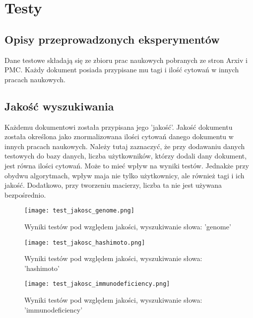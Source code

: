 

\section{Testy}
\subsection{Opisy przeprowadzonych eksperymentów}

Dane testowe składają się ze zbioru prac naukowych pobranych ze stron Arxiv i PMC. Każdy dokument posiada przypisane mu tagi i ilość cytowań w innych pracach naukowych. 



\subsection{Jakość wyszukiwania}

Każdemu dokumentowi została przypisana jego 'jakość'. Jakość dokumentu została określona jako znormalizowana ilości cytowań danego dokumentu w innych pracach naukowych. Należy tutaj zaznaczyć, że przy dodawaniu danych testowych do bazy danych, liczba użytkowników, którzy dodali dany dokument, jest równa ilości cytowań. Może to mieć wpływ na wyniki testów. Jednakże przy obydwu algorytmach, wpływ maja nie tylko użytkownicy, ale również tagi i ich jakość. Dodatkowo, przy tworzeniu macierzy, liczba ta nie jest używana bezpośrednio.



\begin{figure}[tb]
    \centering
    \texttt{[image: test\_jakosc\_genome.png]}
    \caption{Wyniki testów pod względem jakości, wyszukiwanie słowa: 'genome'}
    \label{fig:jakosc-genome}

\end{figure}

\begin{figure}[tb]
    \centering
    \texttt{[image: test\_jakosc\_hashimoto.png]}
    \caption{Wyniki testów pod względem jakości, wyszukiwanie słowa: 'hashimoto'}
    \label{fig:jakosc-hashimoto}

\end{figure}

\begin{figure}[tb]
    \centering
    \texttt{[image: test\_jakosc\_immunodeficiency.png]}
    \caption{Wyniki testów pod względem jakości, wyszukiwanie słowa: 'immunodeficiency'}
    \label{fig:jakosc-immunodeficiency}

\end{figure}

